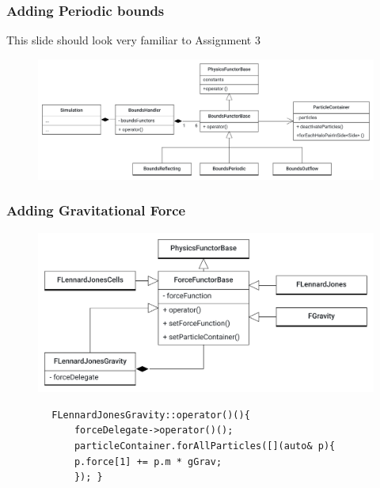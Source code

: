 \begin{frame}
	\frametitle{Adding Periodic bounds}
	\large
	This slide should look very familiar to Assignment 3
		\begin{figure}
			\centering
			\includegraphics[width=0.95\linewidth]{BoundaryMolSim}
			\label{fig:boundarymolsim}
		\end{figure}
\end{frame}

\begin{frame}[fragile]
	\frametitle{Adding Gravitational Force}
			\begin{figure}
				\centering
				\includegraphics[width=0.6\linewidth]{FGravity_added}
				\label{fig:fgravityadded}
			\end{figure}
			
\begin{lstlisting}
		FLennardJonesGravity::operator()(){
			forceDelegate->operator()();
			particleContainer.forAllParticles([](auto& p){
			p.force[1] += p.m * gGrav;
			});	}
\end{lstlisting}

		
	
\end{frame}

